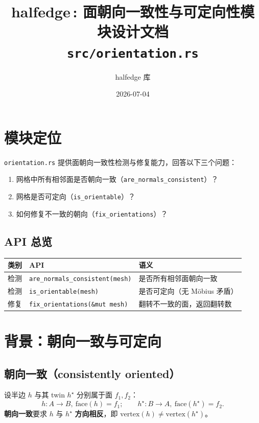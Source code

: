 \documentclass[11pt,a4paper]{article}
\title{\textbf{halfedge\,: 面朝向一致性与可定向性模块设计文档} \\ \large \texttt{src/orientation.rs}}
\author{halfedge 库}
\date{2026-07-04}
\begin{document}
\maketitle
\tableofcontents

\section{模块定位}

\texttt{orientation.rs} 提供面朝向一致性检测与修复能力，回答以下三个问题：

\begin{enumerate}
  \item 网格中所有相邻面是否朝向一致（\texttt{are\_normals\_consistent}）？
  \item 网格是否可定向（\texttt{is\_orientable}）？
  \item 如何修复不一致的朝向（\texttt{fix\_orientations}）？
\end{enumerate}

\subsection{API 总览}

\begin{center}
\renewcommand{\arraystretch}{1.18}
\begin{tabular}{@{}lll@{}}
  \toprule
  \textbf{类别} & \textbf{API} & \textbf{语义} \\
  \midrule
  检测 & \texttt{are\_normals\_consistent(mesh)} & 是否所有相邻面朝向一致 \\
  检测 & \texttt{is\_orientable(mesh)}           & 是否可定向（无 Möbius 矛盾） \\
  修复 & \texttt{fix\_orientations(\&mut mesh)}   & 翻转不一致的面，返回翻转数 \\
  \bottomrule
\end{tabular}
\end{center}

\section{背景：朝向一致与可定向}

\subsection{朝向一致（consistently oriented）}

设半边 $h$ 与其 twin $h^\star$ 分别属于面 $f_1, f_2$：
\[
  h: A \to B,\ \mathrm{face}(h) = f_1; \qquad
  h^\star: B \to A,\ \mathrm{face}(h^\star) = f_2.
\]
\textbf{朝向一致}要求 $h$ 与 $h^\star$ \textbf{方向相反}，即
$\mathrm{vertex}(h) \ne \mathrm{vertex}(h^\star)$。
\end{document}
